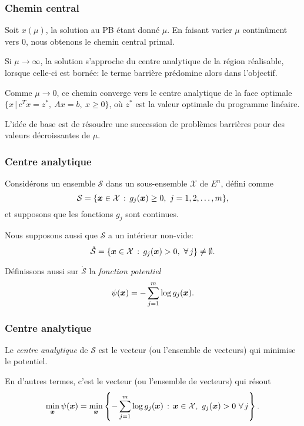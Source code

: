 \documentclass[usepdftitle=false, aspectratio=169]{beamer}
\begin{document}
\begin{frame}
\frametitle{Chemin central}

Soit $x(\mu)$, la solution au PB étant donné $\mu$.
En faisant varier $\mu$ continûment vers 0, nous obtenons le chemin central primal.

\mbox{}

Si $\mu \rightarrow \infty$, la solution s'approche du centre analytique de la région réalisable, lorsque celle-ci est bornée: le terme barrière prédomine alors dans l'objectif.

\mbox{}

Comme $\mu \rightarrow 0$, ce chemin converge vers le centre analytique de la face optimale $\lbrace x \,|\, c^Tx = z^*,\ Ax = b,\ x \geq 0 \rbrace$, où $z^*$ est la valeur optimale du programme linéaire.

\mbox{}

L'idée de base est de résoudre une succession de problèmes barrières pour des valeurs décroissantes de $\mu$.

\end{frame}

\begin{frame}
\frametitle{Centre analytique}

Considérons un ensemble $\mathcal{S}$ dans un sous-ensemble $\mathcal{X}$ de $E^n$, défini comme
\[
\mathcal{S} = \lbrace {\boldsymbol{x}} \in \mathcal{X}\,:\, g_j({\boldsymbol{x}}) \geq 0,\ j = 1,2,\ldots,m \rbrace,
\]
et supposons que les fonctions $g_j$ sont continues.

\mbox{}

Nous supposons aussi que $\mathcal{S}$ a un intérieur non-vide:
\[
\mathring{\mathcal{S}} = \lbrace {\boldsymbol{x}} \in \mathcal{X} \,:\, g_j({\boldsymbol{x}}) > 0,\ \forall\, j \rbrace \ne \emptyset.
\]

\mbox{}

Définissons aussi sur $\mathring{\mathcal{S}}$ la {\em fonction potentiel}
\[
\psi({\boldsymbol{x}}) = -\sum_{j = 1}^m \log g_j({\boldsymbol{x}}).
\]

\end{frame}

\begin{frame}
\frametitle{Centre analytique}

Le {\em centre analytique} de $\mathcal{S}$ est le vecteur (ou l'ensemble de vecteurs) qui minimise le potentiel.

\mbox{}

En d'autres termes, c'est le vecteur (ou l'ensemble de vecteurs) qui résout
\[
\min_{{\boldsymbol{x}}} \psi({\boldsymbol{x}}) =
\min_{{\boldsymbol{x}}}
\left\lbrace
-\sum_{j = 1}^m \log g_j({\boldsymbol{x}}) \,:\, {\boldsymbol{x}} \in \mathcal{X},\ g_j({\boldsymbol{x}}) > 0\ \forall\, j
\right\rbrace.
\]

\end{frame}
\end{document}

